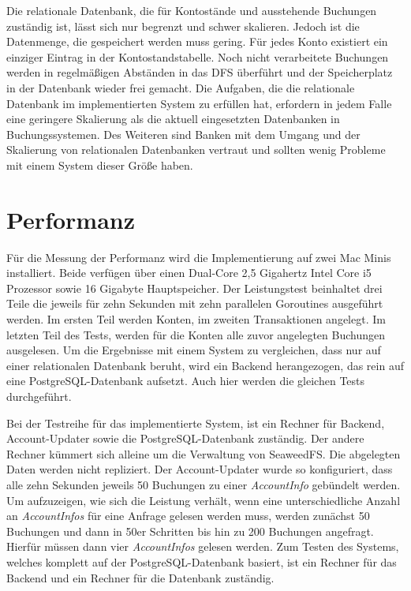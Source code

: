 \documentclass[12pt,oneside,a4paper,parskip]{scrbook}
\begin{document}
Die relationale Datenbank, die für Kontostände und ausstehende Buchungen zuständig ist, lässt sich nur begrenzt und schwer skalieren. Jedoch ist die Datenmenge, die gespeichert werden muss gering. Für jedes Konto existiert ein einziger Eintrag in der Kontostandstabelle. Noch nicht verarbeitete Buchungen werden in regelmäßigen Abständen in das DFS überführt und der Speicherplatz in der Datenbank wieder frei gemacht. Die Aufgaben, die die relationale Datenbank im implementierten System zu erfüllen hat, erfordern in jedem Falle eine geringere Skalierung als die aktuell eingesetzten Datenbanken in Buchungssystemen. Des Weiteren sind Banken mit dem Umgang und der Skalierung von relationalen Datenbanken vertraut und sollten wenig Probleme mit einem System dieser Größe haben.


\section{Performanz}
Für die Messung der Performanz wird die Implementierung auf zwei Mac Minis installiert. Beide verfügen über einen Dual-Core 2,5 Gigahertz Intel Core i5 Prozessor sowie 16 Gigabyte Hauptspeicher.
Der Leistungstest beinhaltet drei Teile die jeweils für zehn Sekunden mit zehn parallelen Goroutines ausgeführt werden. Im ersten Teil werden Konten, im zweiten Transaktionen angelegt. Im letzten Teil des Tests, werden für die Konten alle zuvor angelegten Buchungen ausgelesen. Um die Ergebnisse mit einem System zu vergleichen, dass nur auf einer relationalen Datenbank beruht, wird ein Backend herangezogen, das rein auf eine PostgreSQL-Datenbank aufsetzt. Auch hier werden die gleichen Tests durchgeführt.

Bei der Testreihe für das implementierte System, ist ein Rechner für Backend, Account-Updater sowie die PostgreSQL-Datenbank zuständig.
Der andere Rechner kümmert sich alleine um die Verwaltung von SeaweedFS. Die abgelegten Daten werden nicht repliziert. Der Account-Updater wurde so konfiguriert, dass alle zehn Sekunden jeweils 50 Buchungen zu einer \textit{AccountInfo} gebündelt werden. Um aufzuzeigen, wie sich die Leistung verhält, wenn eine unterschiedliche Anzahl an \textit{AccountInfos} für eine Anfrage gelesen werden muss, werden zunächst 50 Buchungen und dann in 50er Schritten bis hin zu 200 Buchungen angefragt. Hierfür müssen dann vier \textit{AccountInfos} gelesen werden. 
Zum Testen des Systems, welches komplett auf der PostgreSQL-Datenbank basiert, ist ein Rechner für das Backend und ein Rechner für die Datenbank zuständig.
\end{document}
